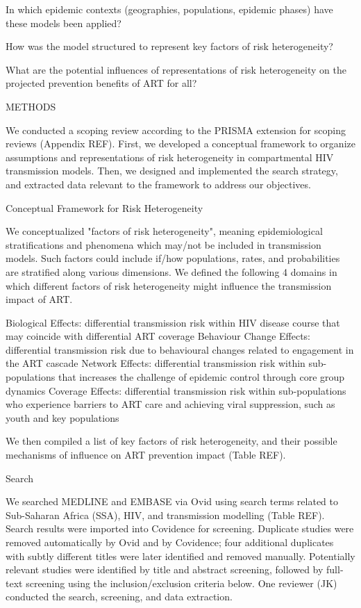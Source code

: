       In which epidemic contexts (geographies, populations, epidemic phases)
      have these models been applied?

      How was the model structured to represent key factors of risk heterogeneity?

      What are the potential influences of representations of risk heterogeneity
      on the projected prevention benefits of ART for all?

METHODS

We conducted a scoping review according to the PRISMA extension for scoping reviews
(Appendix REF).
First, we developed a conceptual framework to organize
assumptions and representations of risk heterogeneity
in compartmental HIV transmission models.
Then, we designed and implemented the search strategy,
and extracted data relevant to the framework to address our objectives.

Conceptual Framework for Risk Heterogeneity

We conceptualized "factors of risk heterogeneity", meaning
epidemiological stratifications and phenomena which may/not be included in transmission models.
Such factors could include if/how populations, rates, and probabilities
are stratified along various dimensions.
We defined the following 4 domains in which
different factors of risk heterogeneity might influence the transmission impact of ART.

   Biological Effects:
  differential transmission risk within HIV disease course
  that may coincide with differential ART coverage
   Behaviour Change Effects:
  differential transmission risk due to
  behavioural changes related to engagement in the ART cascade
   Network Effects:
  differential transmission risk within sub-populations
  that increases the challenge of epidemic control through core group dynamics
   Coverage Effects:
  differential transmission risk within sub-populations
  who experience barriers to ART care and achieving viral suppression,
  such as youth and key populations

We then compiled a list of key factors of risk heterogeneity,
and their possible mechanisms of influence on ART prevention impact (Table REF).

Search

We searched MEDLINE and EMBASE via Ovid
using search terms related to Sub-Saharan Africa (SSA), HIV, and transmission modelling
(Table REF).
Search results were imported into Covidence for screening.
Duplicate studies were removed automatically by Ovid and by Covidence;
four additional duplicates with subtly different titles were later identified and removed manually.
Potentially relevant studies were identified by title and abstract screening, followed 
by full-text screening using the inclusion/exclusion criteria below. 
One reviewer (JK) conducted the search, screening, and data extraction.

